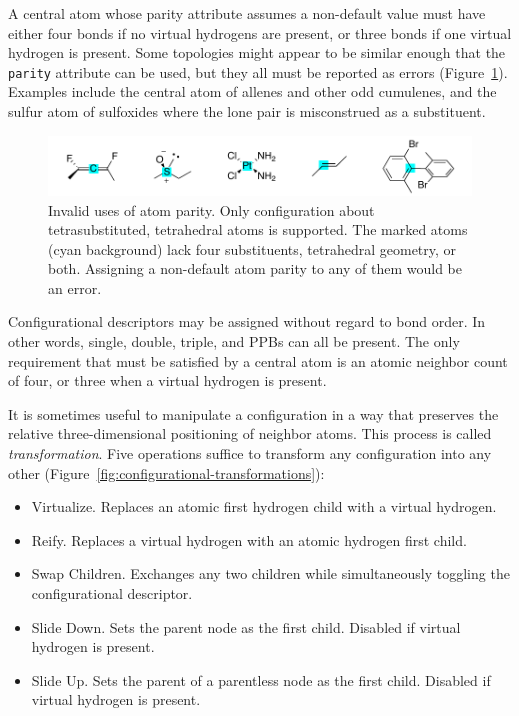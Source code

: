 \documentclass{article}
\def\ttt{\texttt}
\begin{document}
A central atom whose parity attribute assumes a non-default value must have either four bonds if no virtual hydrogens are present, or three bonds if one virtual hydrogen is present. Some topologies might appear to be similar enough that the \ttt{parity} attribute can be used, but they all must be reported as errors (Figure~\ref{fig:invalid-atom-parity}). Examples include the central atom of allenes and other odd cumulenes, and the sulfur atom of sulfoxides where the lone pair is misconstrued as a substituent.

\begin{figure}
    \centering
    \includegraphics[width=\columnwidth]{invalid-atom-parity.pdf}
    \caption{Invalid uses of atom parity. Only configuration about tetrasubstituted, tetrahedral atoms is supported. The marked atoms (cyan background) lack four substituents, tetrahedral geometry, or both. Assigning a non-default atom parity to any of them would be an error.}
    \label{fig:invalid-atom-parity}
\end{figure}

Configurational descriptors may be assigned without regard to bond order. In other words, single, double, triple, and PPBs can all be present. The only requirement that must be satisfied by a central atom is an atomic neighbor count of four, or three when a virtual hydrogen is present.

It is sometimes useful to manipulate a configuration in a way that preserves the relative three-dimensional positioning of neighbor atoms. This process is called \textit{transformation}. Five operations suffice to transform any configuration into any other (Figure~\ref{fig:configurational-transformations}):

\begin{itemize}
    \item{Virtualize. Replaces an atomic first hydrogen child with a virtual hydrogen.}
    \item{Reify. Replaces a virtual hydrogen with an atomic hydrogen first child.}
    \item{Swap Children. Exchanges any two children while simultaneously toggling the configurational descriptor.}
    \item{Slide Down. Sets the parent node as the first child. Disabled if virtual hydrogen is present.}
    \item{Slide Up. Sets the parent of a parentless node as the first child. Disabled if virtual hydrogen is present.}
\end{itemize}
\end{document}
